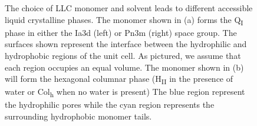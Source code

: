 \documentclass[journal=jpcbfk,manusciprt=article]{achemso}
\begin{document}
\begin{figure}
  \caption{The choice of LLC monomer and solvent leads to different accessible liquid
        crystalline phases. The monomer shown in (a) forms the Q\textsubscript{I} phase
        in either the Ia3d (left) or Pn3m (right) space group. The surfaces shown
        represent the interface between the hydrophilic and hydrophobic regions of the unit
        cell. As pictured, we assume that each region occupies an equal volume. The
        monomer shown in (b) will form the hexagonal columnar phase
        (H\textsubscript{II} in the presence of water or Col\textsubscript{h} when no
         water is present) The blue region represent the hydrophilic pores while the cyan region represents the surrounding hydrophobic monomer tails.}\label{fig:bcc_v_hII}
  \end{figure}


 


\end{document}
